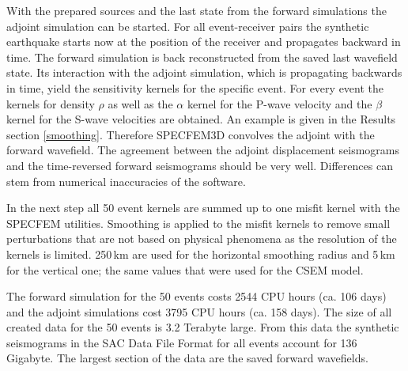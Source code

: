 With the prepared sources and the last state from the forward simulations the adjoint simulation can be started.
For all event-receiver pairs the synthetic earthquake starts now at the position of the receiver and propagates
backward in time.  
The forward simulation is back reconstructed from the saved last wavefield state. 
Its interaction with the adjoint simulation, which is propagating backwards in time,
yield the sensitivity kernels for the specific event. 
For every event the kernels for density $\rho$ as well as the $\alpha$ kernel for the P-wave velocity and the
$\beta$ kernel for the S-wave velocities are obtained. 
An example is given in the Results section \autoref{smoothing}.
Therefore SPECFEM3D convolves the adjoint with the forward wavefield.
The agreement between the adjoint displacement seismograms and the time-reversed forward seismograms should be very well. %
Differences can stem from numerical inaccuracies of the software. %

In the next step all 50 event kernels are summed up to one misfit kernel with the SPECFEM utilities.
Smoothing is applied to the misfit kernels to remove small perturbations that are not based on physical phenomena as the 
resolution of the kernels is limited.
250$\,$km are used for the horizontal smoothing radius and 5$\,$km for the vertical one; the same values that were used for the
CSEM model.

The forward simulation for the 50 events costs 2544 CPU hours (ca. 106 days) and 
the adjoint simulations cost 3795 CPU hours (ca. 158 days).
The size of all created data for the 50 events is 3.2 Terabyte large.
From this data the synthetic seismograms in the SAC Data File Format for all events 
account for 136 Gigabyte.
The largest section of the data are the saved forward wavefields.





